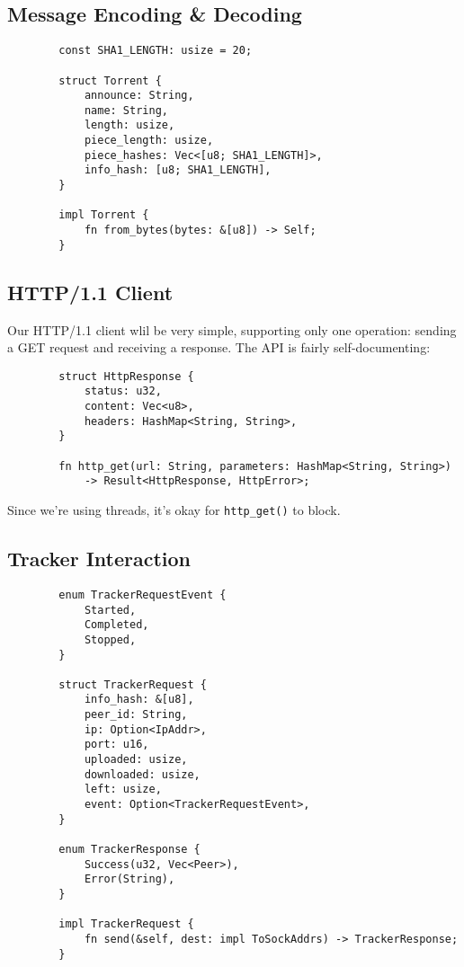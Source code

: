 \documentclass{article}
\begin{document}
    \subsection{Message Encoding \& Decoding}

    \begin{verbatim}
        const SHA1_LENGTH: usize = 20;

        struct Torrent {
            announce: String,
            name: String,
            length: usize,
            piece_length: usize,
            piece_hashes: Vec<[u8; SHA1_LENGTH]>,
            info_hash: [u8; SHA1_LENGTH],
        }

        impl Torrent {
            fn from_bytes(bytes: &[u8]) -> Self;
        }
    \end{verbatim}

    \subsection{HTTP/1.1 Client}

    Our HTTP/1.1 client wlil be very simple, supporting only one operation: sending a GET request and receiving a response.
    The API is fairly self-documenting:

    \begin{verbatim}
        struct HttpResponse {
            status: u32,
            content: Vec<u8>,
            headers: HashMap<String, String>,
        }

        fn http_get(url: String, parameters: HashMap<String, String>)
            -> Result<HttpResponse, HttpError>;
    \end{verbatim}
    Since we're using threads, it's okay for \texttt{http\_get()} to block.


    \subsection{Tracker Interaction}

    \begin{verbatim}
        enum TrackerRequestEvent {
            Started,
            Completed,
            Stopped,
        }

        struct TrackerRequest {
            info_hash: &[u8],
            peer_id: String,
            ip: Option<IpAddr>,
            port: u16,
            uploaded: usize,
            downloaded: usize,
            left: usize,
            event: Option<TrackerRequestEvent>,
        }

        enum TrackerResponse {
            Success(u32, Vec<Peer>),
            Error(String),
        }

        impl TrackerRequest {
            fn send(&self, dest: impl ToSockAddrs) -> TrackerResponse;
        }
    \end{verbatim}
\end{document}
